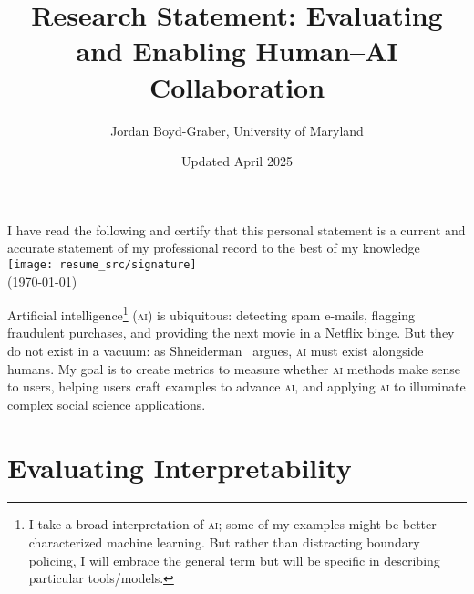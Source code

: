 \usepackage{graphicx}
\usepackage{amssymb}
\usepackage{mfirstuc}
\usepackage{colortbl}
\usepackage{epstopdf}
\usepackage{url}

\newcommand{\abr}[1]{\textsc{#1}}
\newcommand{\newcite}[2]{\capitalisewords{#1} et al.~\cite{#1-#2}}



\newcommand{\student}[1]{\vspace{.5cm}\fbox{\parbox{0.95\linewidth}{{\small
        #1}}}\vspace{.5cm}}
\providecommand{\blue}[1]{{\color{blue}{#1}}}
\providecommand{\red}[1]{{\color{red}{#1}}}
\providecommand{\green}[1]{{\color{green}{#1}}}



 \title{Research Statement: Evaluating and Enabling Human--AI Collaboration}

 \author{Jordan Boyd-Graber, University of Maryland}


\date{Updated April 2025}

\maketitle

\ifumd
\vspace{.2cm}
  \parbox{\linewidth}{I have read the following and certify that this
  personal statement is a current and accurate statement of my
  professional record to the best of my
  knowledge \flushright  \texttt{[image: resume\_src/signature]} \\
\flushright  (\today{})}
\vspace{.5cm}
\fi


Artificial intelligence\footnote{I take a broad interpretation of
\abr{ai}; some of my examples might be better characterized machine
learning.  But rather than distracting boundary policing, I will embrace
the general term but will be specific in describing particular tools/models.}
(\abr{ai}) is ubiquitous: detecting spam e-mails, flagging fraudulent
purchases, and providing the next movie in a Netflix binge.
%
But they do not exist in a vacuum: as
Shneiderman~\cite{shneiderman-21} argues, \abr{ai} must exist
alongside humans.
%
My goal is to create metrics to measure whether \abr{ai} methods make
sense to users, helping users craft examples to advance \abr{ai}, and
applying \abr{ai} to illuminate complex social
science applications.

\section{Evaluating Interpretability}

